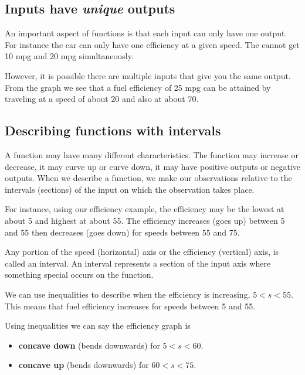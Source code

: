 \documentclass[10pt,]{book}
\newcommand{\terminology}[1]{\textbf{#1}}
\theoremstyle{plain}
\theoremstyle{definition}
\newcommand{\lt}{ < }
\begin{document}
\subsection[Inputs have \emph{unique} outputs]{Inputs have \emph{unique} outputs}\label{subsection-1}
An important aspect of functions is that each input can only have one output.  For instance the car can only have one efficiency at a given speed. The cannot get 10 mpg and 20 mpg simultaneously.%
\par
However, it is possible there are multiple inputs that give you the same output.  From the graph we see that a fuel efficiency of 25 mpg can be attained by traveling at a speed of about \SI{20}{\mileperhour} and also at about \SI{70}{\mileperhour}.%
\typeout{************************************************}
\typeout{************************************************}
\subsection[Describing functions with intervals]{Describing functions with intervals}\label{subsection-2}
A function may have many different characteristics. The function may increase or decrease, it may curve up or curve down, it may have positive outputs or negative outputs. When we describe a function, we make our observations relative to the intervals (sections) of the input on which the observation takes place.%
\par
For instance, using our efficiency example, the efficiency may be the lowest at about \SI{5}{\mileperhour} and highest at about \SI{55}{\mileperhour}. The efficiency increases (goes up) between \num{5} and \SI{55}{\mileperhour} then decreases (goes down) for speeds between \num{55} and \SI{75}{\mileperhour}.%
\par
Any portion of the speed (horizontal) axis or the efficiency (vertical) axis, is called an interval.  An interval represents a section of the input axis where something special occurs on the function.%
\par
We can use inequalities to describe when the efficiency is increasing, \(5\lt s\lt55\).  This means that fuel efficiency increases for speeds between \num{5} and \SI{55}{\mileperhour}.%
\par
Using inequalities we can say the efficiency graph is%
\leavevmode%
\begin{itemize}[label=\textbullet]
\item{}\terminology{concave down} (bends downwards) for \(5\lt s\lt60\).%
\item{}\terminology{concave up} (bends downwards) for \(60\lt s\lt75\).%
\end{itemize}
\typeout{************************************************}
\typeout{************************************************}
\end{document}
